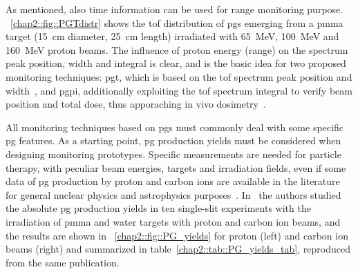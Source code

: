 As mentioned, also time information can be used for range monitoring purpose.  \figurename~\ref{chap2::fig::PGTdistr} shows the \gls{tof} distribution of \glspl{pg} emerging from a \gls{pmma} target (15~cm diameter, 25~cm length) irradiated with 65~MeV, 100~MeV and 160~MeV proton beams. The influence of proton energy (range) on the spectrum peak position, width and integral is clear, and is the basic idea for two proposed monitoring techniques: \gls{pgt}, which is based on the \gls{tof} spectrum peak position and width~\parencite{Golnik2014}, and \gls{pgpi}, additionally exploiting the \gls{tof} spectrum integral to verify beam position and total dose, thus apporaching in vivo dosimetry~\parencite{Krimmer2017b}. 

All monitoring techniques based on \glspl{pg} must commonly deal with some specific \gls{pg} features. As a starting point, \gls{pg} production yields must be considered when designing monitoring prototypes. 
Specific measurements are needed for particle therapy, with peculiar beam energies, targets and irradiation fields, even if some data of \gls{pg} production by proton and carbon ions are available in the literature for general nuclear physics and astrophysics purposes~\parencite{Dyer1981, Kiener1998}.
In~\cite{Pinto2015} the authors studied the absolute \gls{pg} production yields in ten single-slit experiments with the irradiation of \gls{pmma} and water targets with proton and carbon ion beams, and the results are shown in \figurename~\ref{chap2::fig::PG_yields} for proton (left) and carbon ion beams (right) and summarized in table~\ref{chap2::tab::PG_yields_tab}, reproduced from the same publication. 

